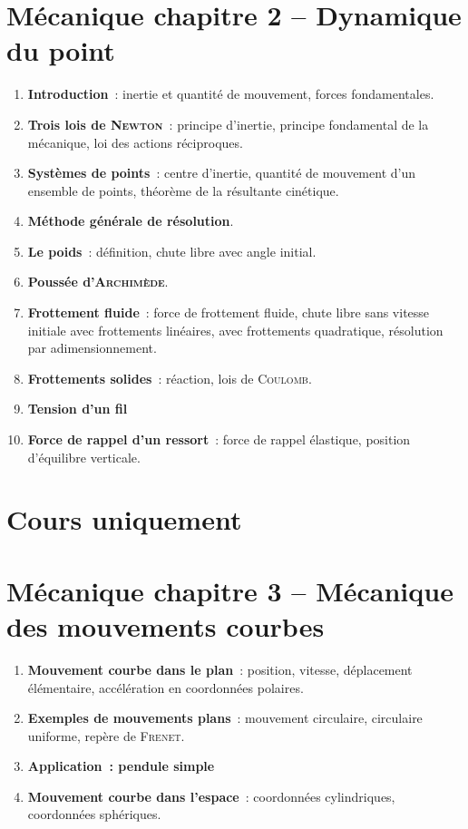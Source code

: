 \documentclass[a4paper, 12pt, final, garamond]{book}
\begin{document}
\section*{Mécanique chapitre 2 -- Dynamique du point}
\begin{enumerate}[label=\Roman*]
    \item \textbf{Introduction}~: inertie et quantité de mouvement, forces
        fondamentales.
    \item \textbf{Trois lois de \textsc{Newton}}~: principe d'inertie, principe
        fondamental de la mécanique, loi des actions réciproques.
    \item \textbf{Systèmes de points}~: centre d'inertie, quantité de mouvement
        d'un ensemble de points, théorème de la résultante cinétique.
    \item \textbf{Méthode générale de résolution}.
    \item \textbf{Le poids}~: définition, chute libre avec angle initial.
    \item \textbf{Poussée d'\textsc{Archimède}}.
    \item \textbf{Frottement fluide}~: force de frottement fluide, chute libre
        sans vitesse initiale avec frottements linéaires, avec frottements
        quadratique, résolution par adimensionnement.
    \item \textbf{Frottements solides}~: réaction, lois de \textsc{Coulomb}.
    \item \textbf{Tension d'un fil}
    \item \textbf{Force de rappel d'un ressort}~: force de rappel élastique,
        position d'équilibre verticale.
\end{enumerate}

\section{Cours uniquement}
\section*{Mécanique chapitre 3 -- Mécanique des mouvements courbes}
\begin{enumerate}[label=\Roman*]
    \item \textbf{Mouvement courbe dans le plan}~: position, vitesse,
        déplacement élémentaire, accélération en coordonnées polaires.
    \item \textbf{Exemples de mouvements plans}~: mouvement circulaire,
        circulaire uniforme, repère de \textsc{Frenet}.
    \item \textbf{Application~: pendule simple}
    \item \textbf{Mouvement courbe dans l'espace}~: coordonnées cylindriques,
        coordonnées sphériques.
\end{enumerate}
\end{document}
